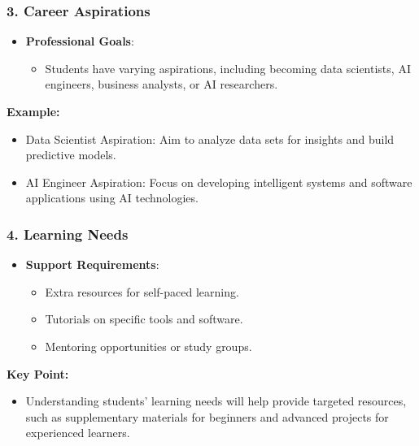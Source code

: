 \documentclass[aspectratio=169]{beamer}
\begin{document}
\begin{frame}[fragile]
    \frametitle{3. Career Aspirations}
    \begin{itemize}
        \item \textbf{Professional Goals}:
            \begin{itemize}
                \item Students have varying aspirations, including becoming data scientists, AI engineers, business analysts, or AI researchers.
            \end{itemize}
    \end{itemize}
    
    \textbf{Example:}
    \begin{itemize}
        \item Data Scientist Aspiration: Aim to analyze data sets for insights and build predictive models.
        \item AI Engineer Aspiration: Focus on developing intelligent systems and software applications using AI technologies.
    \end{itemize}
\end{frame}

\begin{frame}[fragile]
    \frametitle{4. Learning Needs}
    \begin{itemize}
        \item \textbf{Support Requirements}:
            \begin{itemize}
                \item Extra resources for self-paced learning.
                \item Tutorials on specific tools and software.
                \item Mentoring opportunities or study groups.
            \end{itemize}
    \end{itemize}
    
    \textbf{Key Point:}
    \begin{itemize}
        \item Understanding students’ learning needs will help provide targeted resources, such as supplementary materials for beginners and advanced projects for experienced learners.
    \end{itemize}
\end{frame}
\end{document}
